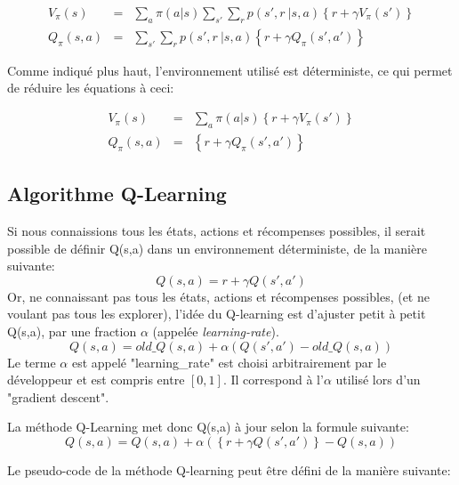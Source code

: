 \documentclass[11pt,a4paper]{report}
\begin{document}
    \begin{eqnarray}
      V_\pi(s) &=& \sum_a\pi(a|s)\sum_{s'}\sum_rp(s',r\ |s,a)\left\{r+\gamma V_\pi(s')\right\} \\
      Q_\pi(s,a) &=& \sum_{s'}\sum_rp(s',r\ |s,a)\left\{r+\gamma Q_\pi(s',a')\right\}
    \end{eqnarray}
    
    \par Comme indiqué plus haut, l'environnement utilisé est déterministe, ce qui permet de réduire les équations à ceci: 
    
    \begin{eqnarray}
      V_\pi(s) &=& \sum_a\pi(a|s)\left\{r+\gamma V_\pi(s')\right\} \\
      Q_\pi(s,a) &=& \left\{r+\gamma Q_\pi(s',a')\right\}
    \end{eqnarray}
    
  \subsection{Algorithme Q-Learning}
  
   \par Si nous connaissions tous les états, actions et récompenses possibles, il serait possible de définir Q(s,a) dans un environnement déterministe, de la manière suivante: 
    $$Q(s,a) = r +  \gamma Q(s',a')$$
    Or, ne connaissant pas tous les états, actions et récompenses possibles, (et ne voulant pas tous les explorer), l'idée du Q-learning est d'ajuster petit à petit Q(s,a), par une fraction $\alpha$ (appelée \textit{learning-rate}).  
    $$Q(s,a) = old\_Q(s,a) + \alpha(Q(s',a') - old\_Q(s,a))$$
    Le terme $\alpha$ est appelé "learning\_rate" est choisi arbitrairement par le développeur et est compris entre $[0,1]$. Il correspond à l'$\alpha$ utilisé lors d'un "gradient descent". 
 
    \newpage   
    \par La méthode Q-Learning met donc Q(s,a) à jour selon la formule suivante: 
    $$Q(s,a) = Q(s,a) + \alpha(\left\{  r + \gamma Q(s', a') \right\} - Q(s,a) )$$  
    
    \par Le pseudo-code de la méthode Q-learning peut être défini de la manière suivante: 
  
\end{document}
